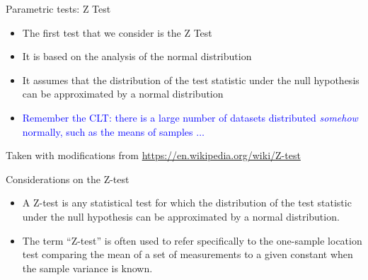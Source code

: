 \documentclass{beamer}
\begin{document}
\begin{frame}
{\centerline{Parametric tests: Z Test}}

\begin{itemize}
    \item The first test that we consider is the Z Test
    \item It is based on the analysis of the normal distribution
    \item It assumes that the distribution of the test statistic under the null hypothesis can be approximated by a normal distribution\newline
    \item \textcolor{blue}{Remember the CLT: there is a large number of datasets distributed \textit{somehow} normally, such as the means of samples $\ldots$}
\end{itemize}

\begin{center}
\tiny{Taken with modifications from \url{https://en.wikipedia.org/wiki/Z-test}}
\end{center}

\end{frame}

\begin{frame}
{\centerline{Considerations on the Z-test}}

\begin{itemize}
    \item A Z-test is any statistical test for which the distribution of the test statistic under the null hypothesis can be approximated by a normal distribution.\\
    \item The term ``Z-test'' is often used to refer specifically to the one-sample location test comparing the mean of a set of measurements to a given constant when the sample variance is known.
\end{itemize}

\end{frame}
\end{document}
